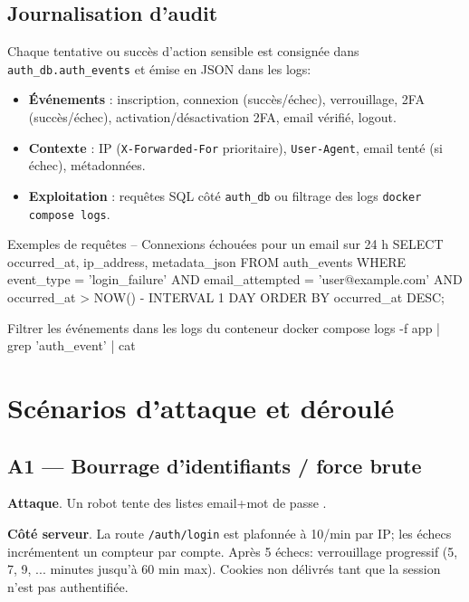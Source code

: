 \subsection*{Journalisation d'audit}
\noindent Chaque tentative ou succès d'action sensible est consignée dans \texttt{auth\_db.auth\_events} et émise en JSON dans les logs:\
\begin{itemize}
  \item \textbf{Événements} : inscription, connexion (succès/échec), verrouillage, 2FA (succès/échec), activation/désactivation 2FA, email vérifié, logout.
  \item \textbf{Contexte} : IP (\texttt{X-Forwarded-For} prioritaire), \texttt{User-Agent}, email tenté (si échec), métadonnées.
  \item \textbf{Exploitation} : requêtes SQL côté \texttt{auth\_db} ou filtrage des logs \texttt{docker compose logs}.
\end{itemize}

\begin{codebox}[language=SQL]{Exemples de requêtes}
-- Connexions échouées pour un email sur 24 h
SELECT occurred_at, ip_address, metadata_json
FROM auth_events
WHERE event_type = 'login_failure'
  AND email_attempted = 'user@example.com'
  AND occurred_at > NOW() - INTERVAL 1 DAY
ORDER BY occurred_at DESC;
\end{codebox}

\begin{codebox}[language=bash]{Filtrer les événements dans les logs du conteneur}
docker compose logs -f app | grep 'auth_event' | cat
\end{codebox}

\section{Scénarios d'attaque et déroulé}

\subsection*{A1 — Bourrage d'identifiants / force brute}
\textbf{Attaque}. Un robot tente des listes \og email+mot de passe \fg{}.

\textbf{Côté serveur}. La route \texttt{/auth/login} est plafonnée à 10/min par IP; les échecs incrémentent un compteur par compte. Après 5 échecs: verrouillage progressif (5, 7, 9, ... minutes jusqu'à 60 min max). Cookies non délivrés tant que la session n'est pas authentifiée.


